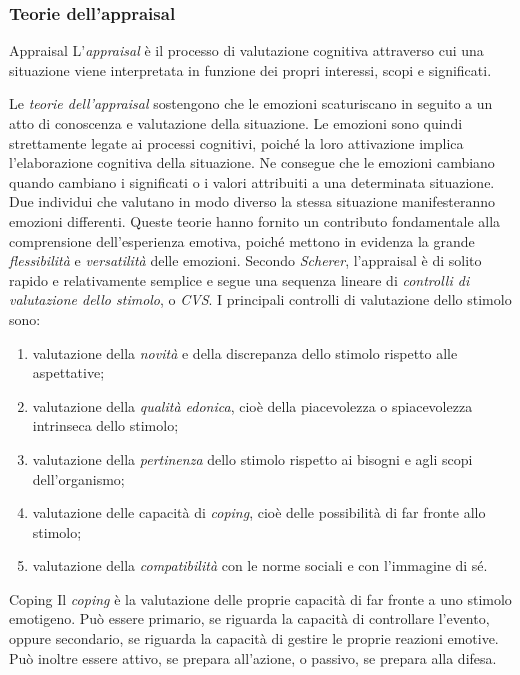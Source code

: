 \documentclass[a4paper]{article}
\begin{document}
\subsubsection{Teorie dell'appraisal}
\begin{snippetdefinition}{Appraisal}
    L'\emph{appraisal} è il processo di valutazione cognitiva attraverso cui una situazione viene interpretata in funzione dei propri interessi, scopi e significati.
\end{snippetdefinition}
Le \emph{teorie dell'appraisal} sostengono che le emozioni scaturiscano in seguito a un atto di conoscenza e valutazione della situazione. Le emozioni sono quindi strettamente legate ai processi cognitivi, poiché la loro attivazione implica l'elaborazione cognitiva della situazione.
Ne consegue che le emozioni cambiano quando cambiano i significati o i valori attribuiti a una determinata situazione. Due individui che valutano in modo diverso la stessa situazione manifesteranno emozioni differenti.
Queste teorie hanno fornito un contributo fondamentale alla comprensione dell'esperienza emotiva, poiché mettono in evidenza la grande \emph{flessibilità} e \emph{versatilità} delle emozioni.
Secondo \emph{Scherer}, l'appraisal è di solito rapido e relativamente semplice e segue una sequenza lineare di \emph{controlli di valutazione dello stimolo}, o \emph{CVS}.
I principali controlli di valutazione dello stimolo sono:
\begin{enumerate}
    \item valutazione della \emph{novità} e della discrepanza dello stimolo rispetto alle aspettative;
    \item valutazione della \emph{qualità edonica}, cioè della piacevolezza o spiacevolezza intrinseca dello stimolo;
    \item valutazione della \emph{pertinenza} dello stimolo rispetto ai bisogni e agli scopi dell'organismo;
    \item valutazione delle capacità di \emph{coping}, cioè delle possibilità di far fronte allo stimolo;
    \item valutazione della \emph{compatibilità} con le norme sociali e con l'immagine di sé.
\end{enumerate}
\begin{snippetdefinition}{Coping}
    Il \emph{coping} è la valutazione delle proprie capacità di far fronte a uno stimolo emotigeno. Può essere primario, se riguarda la capacità di controllare l'evento, oppure secondario, se riguarda la capacità di gestire le proprie reazioni emotive. Può inoltre essere attivo, se prepara all'azione, o passivo, se prepara alla difesa.
\end{snippetdefinition}
\end{document}
